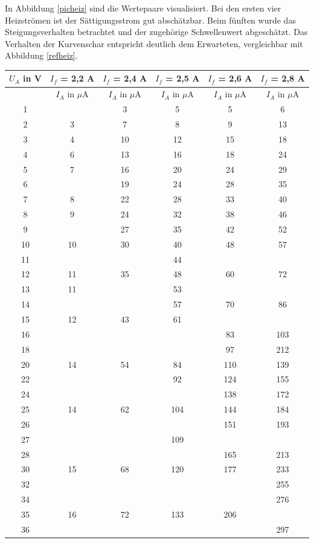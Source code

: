 In Abbildung \ref{picheiz} sind die Wertepaare visualisiert. Bei den ersten vier Heizströmen ist der Sättigungsstrom gut abschätzbar.
Beim fünften wurde das Steigungsverhalten betrachtet und der zugehörige Schwellenwert abgeschätzt. Das Verhalten der Kurvenschar 
entspricht deutlich dem Erwarteten, vergleichbar mit Abbildung \ref{refheiz}.

\renewcommand{\arraystretch}{0.9}
\begin{table}[H]
\begin{tabular}{|c||c|c|c|c|c|}
$U_A$ in V & $I_f$ = 2,2 A  & $I_f$ = 2,4 A  & $I_f$ = 2,5 A  & $I_f$ = 2,6 A  & $I_f$ = 2,8 A\\
 \hline
& $I_A$ in $\mu$A &$I_A$ in $\mu$A &$I_A$ in $\mu$A &$I_A$ in $\mu$A &$I_A$ in $\mu$A \\ 
\hline
1&	&	3&	5&	5&	6\\
2&	3&	7&	8&	9&	13\\
3&	4&	10&	12&	15&	18\\
4&	6&	13&	16&	18&	24\\
5&	7&	16&	20&	24&	29\\
6&	&	19&	24&	28&	35\\
7&	8&	22&	28&	33&	40\\
8&	9&	24&	32&	38&	46\\
9&	&	27&	35&	42&	52\\
10&	10&	30&	40&	48&	57\\
11&	&	&	44&	&	\\
12&	11&	35&	48&	60&	72\\
13&	11&	&	53&	&	\\
14&	&	&	57&	70&	86\\
15&	12&	43&	61&	&	\\
16&	&	&	&	83&	103\\
18&	&	&	&	97&	212\\
20&	14&	54&	84&	110&	139\\
22&	&	&	92&	124&	155\\
24&	&	&	&	138&	172\\
25&	14&	62&	104&	144&	184\\
26&	&	&	&	151&	193\\
27&	&	&	109&	&	\\
28&	&	&		&165&	213\\
30&	15	&68&	120&	177&	233\\
32&	&	&	&	&	255\\
34&	&	&	&	&	276\\
35&	16&	72&	133&	206&	\\
36&	&	&	&	&	297\\

\end{tabular}
\end{table}
